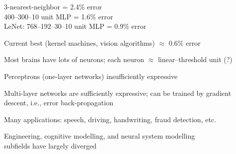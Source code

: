 \documentclass{article}
\begin{document}
\begin{huge}
3-nearest-neighbor = 2.4\% error\\
400--300--10 unit MLP = 1.6\% error\\
LeNet: 768--192--30--10 unit MLP = 0.9\% error

Current best (kernel machines, vision algorithms) $\approx$ 0.6\% error



Most brains have lots of neurons; each neuron $\approx$ linear--threshold unit (?)

Perceptrons (one-layer networks) insufficiently expressive

Multi-layer networks are sufficiently expressive; can be trained by 
gradient descent, i.e., error back-propagation

Many applications: speech, driving, handwriting, fraud detection, etc.

Engineering, cognitive modelling, and neural system modelling\\
subfields have largely diverged

\end{huge}
\end{document}
